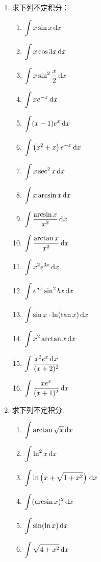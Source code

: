 \begin{solution}
\begin{ex}
\begin{enumerate}
    \item 求下列不定积分：
\begin{multicols}{2}
\begin{enumerate}
    \item $\displaystyle\int x \sin x\,{\rm d} x$
    \item $\displaystyle\int x \cos 3 x\,{\rm d} x$
    \item $\displaystyle\int x \sin ^{2} \dfrac{x}{2}\,{\rm d} x$
    \item $\displaystyle\int x e^{-x}\,{\rm d} x$
    \item $\displaystyle\int (x-1) e^{x}\,{\rm d} x$
    \item $\displaystyle\int \left(x^{2}+x\right) e^{-x}\,{\rm d} x$
    \item $\displaystyle\int  x \sec ^{2} x\,{\rm d} x$
    \item $\displaystyle\int  x \arcsin x\,{\rm d} x$
    \item $\displaystyle\int  \dfrac{\arcsin x}{x^{2}}\,{\rm d} x$
    \item $\displaystyle\int  \dfrac{\arctan x}{x^{2}}\,{\rm d} x$
    \item $\displaystyle\int  x^{2} e^{3 x}\,{\rm d} x$
    \item $\displaystyle\int  e^{a x} \sin ^{2} b x\,{\rm d} x$
    \item $\displaystyle\int  \sin x \cdot \ln (\tan x)\,{\rm d} x$
    \item $\displaystyle\int  x^{2} \arctan x\,{\rm d} x$
    \item $\displaystyle\int  \dfrac{x^{2} e^{x}\,{\rm d} x}{(x+2)^{2}}$
    \item $\displaystyle\int \dfrac{x e^{x}}{(x+1)^{2}}\,{\rm d} x$
\end{enumerate}
\end{multicols}
 \item   求下列不定积分:    
   \begin{multicols}{2}
        \begin{enumerate}
    \item $\displaystyle\int \arctan \sqrt{x}\,{\rm d} x$
    \item $\displaystyle\int \ln ^{2} x \,{\rm d} {x}$
    \item $\displaystyle\int \ln \left(x+\sqrt{1+x^{2}}\right)\,{\rm d} x$
    \item $\displaystyle\int (\arcsin x)^{2}\,{\rm d} x$
    \item $\displaystyle\int \sin(\ln x)\,{\rm d} x$
    \item $\displaystyle\int \sqrt{4+x^2}\,{\rm d} x$
\end{enumerate}
\end{multicols}
\end{enumerate}
\end{ex}
\end{solution}
    

